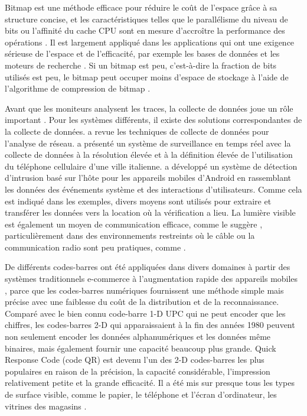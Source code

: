 Bitmap est une méthode efficace pour réduire le coût de l'espace grâce à sa structure concise, et les caractéristiques telles que le parallélisme du niveau de bits ou l'affinité du cache CPU sont en mesure d'accroître la performance des opérations \citep{culpepper2010efficient}. Il est largement appliqué dans les applications qui ont une exigence sérieuse de l'espace et de l'efficacité, par exemple les bases de données et les moteurs de recherche \citep{lemire2014}. Si un bitmap est peu, c'est-à-dire la fraction de bits utilisés est peu, le bitmap peut occuper moins d'espace de stockage à l'aide de l'algorithme de compression de bitmap \citep{antoshenkov1995byte}.

Avant que les moniteurs analysent les traces, la collecte de données joue un rôle important \citep{casley1988collection}. Pour les systèmes différents, il existe des solutions correspondantes de la collecte de données. \cite{zwijze2005auditing} a revue les techniques de collecte de données pour l'analyse de réseau. \cite{calabrese2011real} a présenté un système de surveillance en temps réel avec la collecte de données à la résolution élevée et à la définition élevée de l'utilisation du téléphone cellulaire d'une ville italienne. \cite{shabtai2010applying} a développé un système de détection d'intrusion basé sur l'hôte pour les appareils mobiles d'Android en rassemblant les données des événements système et des interactions d'utilisateurs. Comme cela est indiqué dans les exemples, divers moyens sont utilisés pour extraire et transférer les données vers la location où la vérification a lieu. La lumière visible est également un moyen de communication efficace, comme le suggère \cite{komine2004fundamental}, particulièrement dans des environnements restreints où le câble ou la communication radio sont peu pratiques, comme \cite{vasilescu2005data}.

De différents codes-barres ont été appliquées dans divers domaines à partir des systèmes traditionnels e-commerce à l'augmentation rapide des appareils mobiles \citep{gao2007understanding}, parce que les codes-barres numériques fournissent une méthode simple mais précise avec une faiblesse du coût de la distribution et de la reconnaissance. Comparé avec le bien connu code-barre 1-D UPC qui ne peut encoder que les chiffres, les codes-barres 2-D qui apparaissaient à la fin des années 1980 peuvent non seulement encoder les données alphanumériques et les données même binaires, mais également fournir une capacité beaucoup plus grande. Quick Response Code (code QR) \citep{qrcode-about} est devenu l'un des 2-D codes-barres les plus populaires en raison de la précision, la capacité considérable, l'impression relativement petite et la grande efficacité. Il a été mis sur presque tous les types de surface visible, comme le papier, le téléphone et l'écran d'ordinateur, les vitrines des magasins \citep{okazaki2012benchmarking}.

